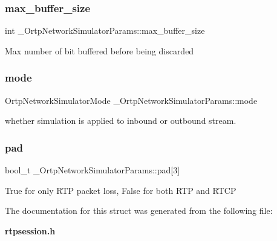 \subsubsection{max\+\_\+buffer\+\_\+size}
{\footnotesize\ttfamily int \+\_\+\+Ortp\+Network\+Simulator\+Params\+::max\+\_\+buffer\+\_\+size}

Max number of bit buffered before being discarded \mbox{\label{struct__OrtpNetworkSimulatorParams_ae3c99a51604ac46edcbc70e896925a07}} 
\subsubsection{mode}
{\footnotesize\ttfamily Ortp\+Network\+Simulator\+Mode \+\_\+\+Ortp\+Network\+Simulator\+Params\+::mode}

whether simulation is applied to inbound or outbound stream. \mbox{\label{struct__OrtpNetworkSimulatorParams_a724eb1785697f4f0f6034a093c08d509}} 
\subsubsection{pad}
{\footnotesize\ttfamily bool\+\_\+t \+\_\+\+Ortp\+Network\+Simulator\+Params\+::pad[3]}

True for only R\+TP packet loss, False for both R\+TP and R\+T\+CP 

The documentation for this struct was generated from the following file\+:\begin{DoxyCompactItemize}
\item 
\textbf{ rtpsession.\+h}\end{DoxyCompactItemize}
